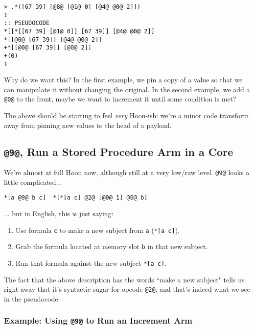 \documentclass[twoside]{article}
\begin{document}
\begin{lstlisting}[style=listingcode]
> .*([67 39] [@8@ [@1@ 0] [@4@ @0@ 2]])
1
:: PSEUDOCODE
*[[*[[67 39] [@1@ 0]] [67 39]] [@4@ @0@ 2]]
*[[@0@ [67 39]] [@4@ @0@ 2]]
+*[[@0@ [67 39]] [@0@ 2]]
+(0)
1
\end{lstlisting}

Why do we want this? In the first example, we pin a copy of a value so that we can manipulate it without changing the original. In the second example, we add a \lstinline[style=inlinecode]{@0@} to the front; maybe we want to increment it until some condition is met?

The above should be starting to feel \emph{very} Hoon-ish: we're a minor code transform away from pinning new values to the head of a payload.

\subsection{\lstinline[style=inlinecode]{@9@}, Run a Stored Procedure Arm in a Core}

We're almost at full Hoon now, although still at a very low/raw level. \lstinline[style=inlinecode]{@9@} looks a little complicated...

\begin{lstlisting}[style=listingcode]
*[a @9@ b c]  *[*[a c] @2@ [@0@ 1] @0@ b]
\end{lstlisting}

\noindent{}
... but in English, this is just saying:

\begin{enumerate}
  \item  Use formula \lstinline[style=inlinecode]{c} to make a new subject from \lstinline[style=inlinecode]{a} (\lstinline[style=inlinecode]{*[a c]}).
  \item  Grab the formula located at memory slot \lstinline[style=inlinecode]{b} in that new subject.
  \item  Run that formula against the new subject \lstinline[style=inlinecode]{*[a c]}.
\end{enumerate}

\noindent{}
The fact that the above description has the words ``make a new subject" tells us right away that it's syntactic sugar for opcode \lstinline[style=inlinecode]{@2@}, and that's indeed what we see in the pseudocode.

\subsubsection{Example: Using \lstinline[style=inlinecode]{@9@} to Run an Increment Arm}
\end{document}
